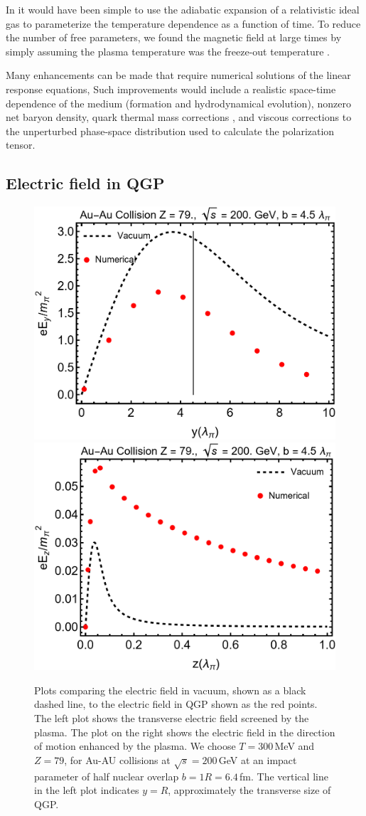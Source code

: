 In \cite{Grayson:2022asf} it would have been simple to use the adiabatic expansion of a relativistic ideal gas \cite{Bjorken:1982qr} to parameterize the temperature dependence as a function of time. To reduce the number of free parameters, we found the magnetic field at large times by simply assuming the plasma temperature was the freeze-out temperature .

Many enhancements can be made that require numerical solutions of the linear response equations, Such improvements would include a realistic space-time dependence of the medium (formation and hydrodynamical evolution), nonzero net baryon density, quark thermal mass corrections \cite{PhysRevD.26.2789}, and viscous corrections to the unperturbed phase-space distribution used to calculate the polarization tensor.

\subsection{Electric field in QGP}

\phantom{Phantom text}
\begin{figure}[h!]
\centering
\includegraphics[width=0.45\linewidth]{plots/chap02QCD/Eyy.png}
\hspace{0.05\linewidth}
\includegraphics[width=0.45\linewidth]{plots/chap02QCD/Ezz.png}
\caption{Plots comparing the electric field in vacuum, shown as a black dashed line, to the electric field in QGP shown as the red points. The left plot shows the transverse electric field screened by the plasma. The plot on the right shows the electric field in the direction of motion enhanced by the plasma. We choose $T = 300$\,MeV and $Z=79$, for Au-AU collisions at $\sqrt{s} = 200$\,GeV at an impact parameter of half nuclear overlap $b = 1 R = 6.4\,$fm. The vertical line in the left plot indicates $ y = R$, approximately the transverse size of QGP. \label{fig:efcomp}}
\end{figure}



